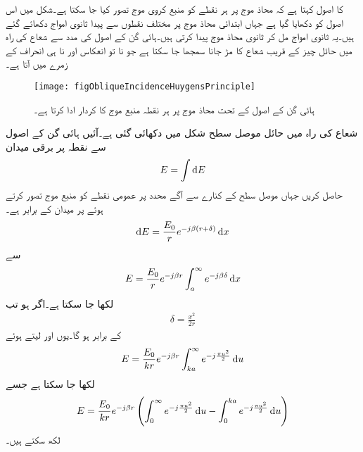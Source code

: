  کا اصول کہتا ہے کہ محاذ موج پر ہر نقطے کو منبع کروی موج تصور کیا جا سکتا ہے۔شکل  میں اس اصول کو دکھایا گیا ہے جہاں ابتدائی محاذ موج پر مختلف نقطوں سے پیدا ثانوی امواج دکھائے گئے ہیں۔یہ ثانوی امواج مل کر ثانوی محاذ موج پیدا کرتی ہیں۔ہائی گن کے اصول کی مدد سے شعاع کی راہ میں حائل چیز کے قریب شعاع کا مڑ جانا سمجھا جا سکتا ہے جو نا تو انعکاس اور نا ہی انحراف کے زمرے میں آتا ہے۔   

\begin{figure}
\centering
\texttt{[image: figObliqueIncidenceHuygensPrinciple]}
\caption{ہائی گن کے اصول کے تحت محاذ موج پر ہر نقطہ منبع موج کا کردار ادا کرتا ہے۔}
\label{شکل_ترچھی_ہائی_گن_اصول}
\end{figure}

شعاع کی راہ میں حائل موصل سطح شکل میں دکھائی گئی ہے۔آئیں ہائی گن کے اصول سے نقطہ  پر برقی میدان 
\begin{align}
E=\int \dif E
\end{align}
حاصل کریں جہاں موصل سطح کے کنارے سے آگے  محدد پر عمومی نقطے کو منبع موج تصور کرتے ہوئے  پر میدان  کے برابر ہے۔
\begin{align}
\dif E=\frac{E_0}{r} e^{-j \beta (r+\delta)} \dif x
\end{align}
سے
\begin{align}
E=\frac{E_0}{r} e^{-j \beta r} \int_a^{\infty} e^{-j \beta \delta} \dif x
\end{align}
لکھا جا سکتا ہے۔اگر  ہو تب
\begin{align}
\delta=\frac{x^2}{2r}
\end{align}
کے برابر ہو گا۔یوں  اور  لیتے ہوئے
\begin{align}
E=\frac{E_0}{k r} e^{-j \beta r} \int_{k a}^{\infty} e^{-j \frac{\pi u^2}{2}} \dif u
\end{align}
لکھا جا سکتا ہے جسے
\begin{align}
E=\frac{E_0}{k r} e^{-j \beta r} \left(\int_0^{\infty} e^{-j \frac{\pi u^2}{2}} \dif u-\int_0^{k a} e^{-j \frac{\pi u^2}{2}} \dif u \right)
\end{align}
لکھ سکتے ہیں۔
